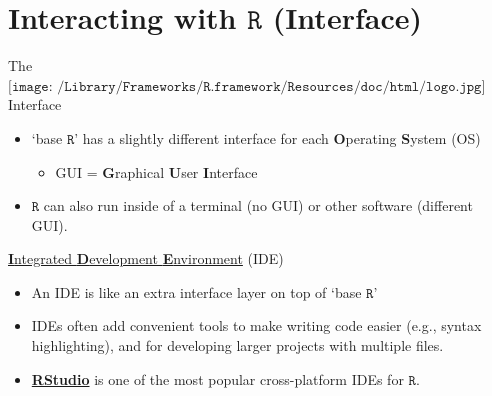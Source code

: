 \documentclass[
  11pt,
  ignorenonframetext,
]{beamer}
\providecommand{\tightlist}{%
  \setlength{\itemsep}{0pt}\setlength{\parskip}{0pt}}
\newcommand{\R}{\texttt{R}}
\begin{document}
\hypertarget{interacting-with-r-interface}{%
\section{\texorpdfstring{Interacting with \(\R\)
(Interface)}{Interacting with \textbackslash R (Interface)}}\label{interacting-with-r-interface}}

\begin{frame}{The
\(\texttt{[image: /Library/Frameworks/R.framework/Resources/doc/html/logo.jpg]}\)
Interface}
\protect\hypertarget{the-includegraphicsheight1emlibraryframeworksr.frameworkresourcesdochtmllogo.jpg-interface}{}
\begin{itemize}
\tightlist
\item
  `base \(\R\)' has a slightly different interface for each
  \textbf{O}perating \textbf{S}ystem (OS)

  \begin{itemize}
  \tightlist
  \item
    GUI = \textbf{G}raphical \textbf{U}ser \textbf{I}nterface
  \end{itemize}
\item
  \(\R\) can also run inside of a terminal (no GUI) or other software
  (different GUI).
\end{itemize}

\begin{block}{\href{https://en.wikipedia.org/wiki/Integrated_development_environment}{\textbf{I}ntegrated
\textbf{D}evelopment \textbf{E}nvironment} (IDE)}
\protect\hypertarget{integrated-development-environment-ide}{}
\begin{itemize}
\tightlist
\item
  An IDE is like an extra interface layer on top of `base \(\R\)'
\item
  IDEs often add convenient tools to make writing code easier (e.g.,
  syntax highlighting), and for developing larger projects with multiple
  files.
\item
  \textbf{\href{https://posit.co/products/open-source/rstudio/}{RStudio}}
  is one of the most popular cross-platform IDEs for \(\R\).

\end{itemize}
\end{block}
\end{frame}
\end{document}
